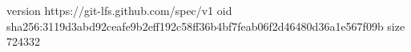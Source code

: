 version https://git-lfs.github.com/spec/v1
oid sha256:3119d3abd92ceafe9b2eff192c58ff36b4bf7feab06f2d46480d36a1e567f09b
size 724332
